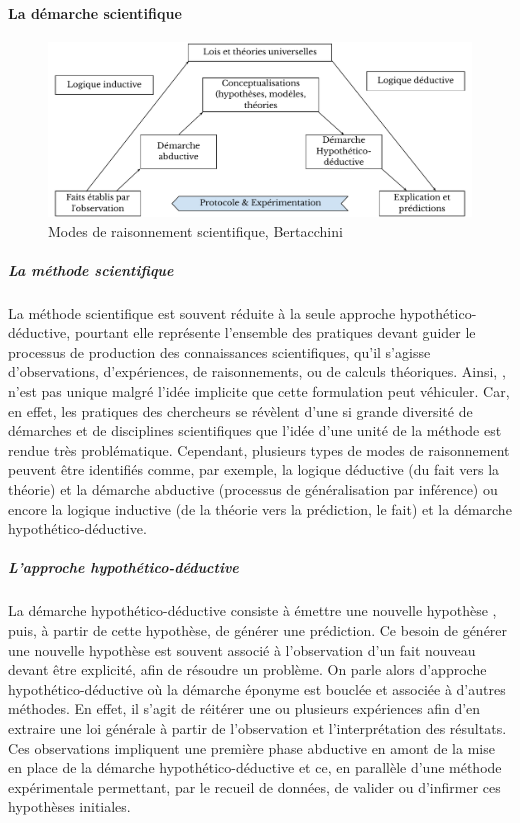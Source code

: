     \paragraph{La démarche scientifique}
        \begin{figure}[!h]
            \centering
            \includegraphics[width=\linewidth]{Figures/Bertacchini-methode-2015.pdf}
            \caption{Modes de raisonnement scientifique, Bertacchini~}
            \label{fig:methode}
        \end{figure}\nocite{atlan2019apprentissage}
      \subparagraph{La méthode scientifique}
        La méthode scientifique est souvent réduite à la seule approche hypothético-déductive, pourtant elle représente l'ensemble des pratiques devant guider le processus de production des connaissances scientifiques, qu'il s'agisse d'observations, d'expériences, de raisonnements, ou de calculs théoriques. Ainsi, , n'est pas unique malgré l'idée implicite que cette formulation peut véhiculer. Car, en effet, les pratiques des chercheurs se révèlent d'une si grande diversité de démarches et de disciplines scientifiques que l'idée d'une unité de la méthode est rendue très problématique. Cependant, plusieurs types  de modes de raisonnement peuvent être identifiés comme, par exemple, la logique déductive (du fait vers la théorie) et la démarche abductive (processus de généralisation par inférence) ou encore la logique inductive (de la théorie vers la prédiction, le fait) et la démarche hypothético-déductive.
      \subparagraph{L'approche hypothético-déductive}
        La démarche hypothético-déductive consiste à émettre une nouvelle hypothèse , puis, à partir de cette hypothèse, de générer une prédiction. Ce besoin de générer une nouvelle hypothèse est souvent associé à l'observation d'un fait nouveau devant être explicité, afin de résoudre un problème. On parle alors d'approche hypothético-déductive où la démarche éponyme est bouclée et associée à d'autres méthodes. En effet, il s'agit de réitérer une ou plusieurs expériences afin d'en extraire une loi générale à partir de l'observation et l'interprétation des résultats. Ces observations impliquent une première phase abductive en amont de la mise en place de la démarche hypothético-déductive et ce, en parallèle d'une méthode expérimentale permettant, par le recueil de données, de valider ou d'infirmer ces hypothèses initiales.
